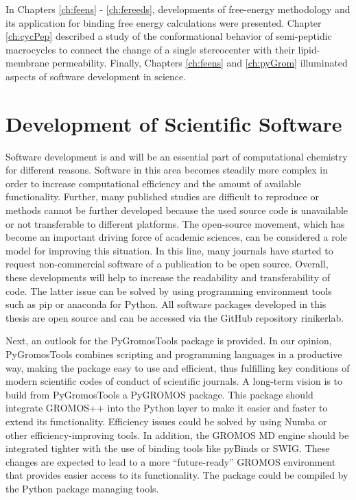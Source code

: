 
In Chapters \ref{ch:feens} - \ref{ch:fereeds}, developments of free-energy methodology and its application for binding free energy calculations were presented. Chapter \ref{ch:cycPep} described a study of the conformational behavior of semi-peptidic macrocycles  to connect the change of a single stereocenter with their lipid-membrane permeability. Finally, Chapters \ref{ch:feens} and \ref{ch:pyGrom} illuminated aspects of software development in science.

\section{Development of Scientific Software}
Software development is and will be an essential part of computational chemistry for different reasons.  Software in this area becomes steadily more complex in order to increase computational efficiency and the amount of available functionality. Further, many published studies are difficult to reproduce or methods cannot be further developed because the used source code is unavailable or not transferable to different platforms.\cite{Walters2013, Walters2020} The open-source movement, which has become an important driving force of academic sciences, can be considered a role model for improving this situation.\cite{Walters2020, Oliphant2007} In this line, many journals have started to request non-commercial software of a publication to be open source. \cite{Jcconduct2021, Scienceconduct2021, Natureconduct2021}  Overall, these developments will help to increase the readability and transferability of code.\cite{Walters2020} The latter issue can be solved by using programming environment tools such as pip or anaconda for Python. \cite{Anaconda2020, Pypi2021} All software packages developed in this thesis are open source and can be accessed via the GitHub repository rinikerlab. %

Next, an outlook for the PyGromosTools package is provided. In our opinion, PyGromosTools combines scripting and programming languages in a productive way, making the package easy to use and efficient, thus fulfilling key conditions of modern scientific codes of conduct of scientific journals. 
A long-term vision is to build from PyGromosTools a PyGROMOS package. This package should integrate GROMOS++ \cite{Eichenberger2011} into the Python layer to make it easier and faster to extend its functionality. Efficiency issues could be solved by using Numba or other efficiency-improving tools. In addition, the GROMOS MD engine \cite{Schmid2012} should be integrated tighter with the use of binding tools like pyBinds or SWIG. \cite{Wenzel2011, Beazley1996} These changes are expected to lead to a more ``future-ready'' GROMOS environment that provides easier access to its functionality. The package could be compiled by the Python package managing tools. 


